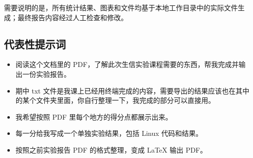 \documentclass[12pt,a4paper,fontset=fandol]{ctexart}
\begin{document}
需要说明的是，所有统计结果、图表和文件均基于本地工作目录中的实际文件生成；最终报告内容经过人工检查和修改。

\subsection{代表性提示词}

\begin{itemize}
  \item 阅读这个文档里的 PDF，了解此次生信实验课程需要的东西，帮我完成并输出一份实验报告。
  \item 期中 txt 文件是我课上已经用终端完成的内容，需要导出的结果应该也在其中的某个文件夹里面，你自行整理一下，我完成的部分可以直接用。
  \item 我希望按照 PDF 里每个地方的得分点都展示出来。
  \item 每一分给我写成一个单独实验结果，包括 Linux 代码和结果。
  \item 按照之前实验报告 PDF 的格式整理，变成 LaTeX 输出 PDF。
\end{itemize}
\end{document}
